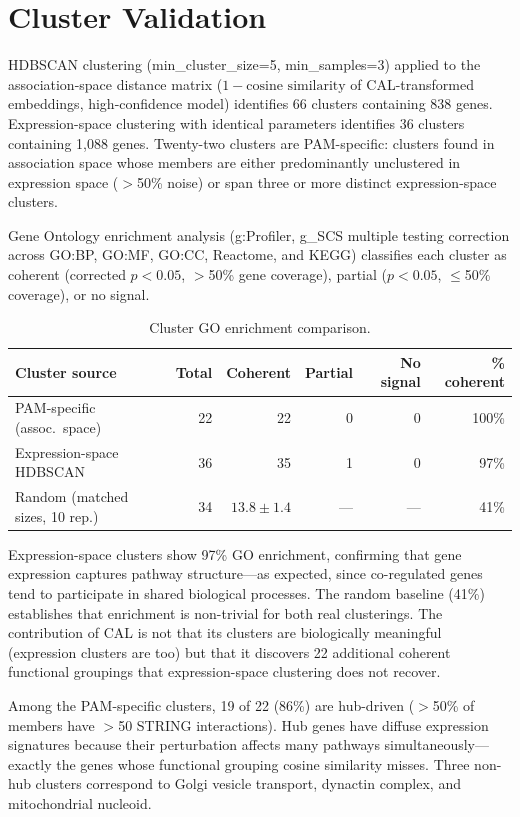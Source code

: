 \documentclass[11pt]{article}
\begin{document}
\section{Cluster Validation}
\label{sec:clusters}

HDBSCAN clustering (min\_cluster\_size=5, min\_samples=3) applied to the association-space distance matrix ($1 - \text{cosine similarity}$ of CAL-transformed embeddings, high-confidence model) identifies 66 clusters containing 838 genes. Expression-space clustering with identical parameters identifies 36 clusters containing 1,088 genes. Twenty-two clusters are PAM-specific: clusters found in association space whose members are either predominantly unclustered in expression space ($>$50\% noise) or span three or more distinct expression-space clusters.

Gene Ontology enrichment analysis (g:Profiler, g\_SCS multiple testing correction across GO:BP, GO:MF, GO:CC, Reactome, and KEGG) classifies each cluster as coherent (corrected $p < 0.05$, $>$50\% gene coverage), partial ($p < 0.05$, $\leq$50\% coverage), or no signal.

\begin{table}[h]
\centering
\caption{Cluster GO enrichment comparison.}
\label{tab:clusters}
\begin{tabular}{lrrrrr}
\toprule
Cluster source & Total & Coherent & Partial & No signal & \% coherent \\
\midrule
PAM-specific (assoc.\ space) & 22 & 22 & 0 & 0 & 100\% \\
Expression-space HDBSCAN & 36 & 35 & 1 & 0 & 97\% \\
Random (matched sizes, 10 rep.) & 34 & $13.8 \pm 1.4$ & --- & --- & 41\% \\
\bottomrule
\end{tabular}
\end{table}

Expression-space clusters show 97\% GO enrichment, confirming that gene expression captures pathway structure---as expected, since co-regulated genes tend to participate in shared biological processes. The random baseline (41\%) establishes that enrichment is non-trivial for both real clusterings. The contribution of CAL is not that its clusters are biologically meaningful (expression clusters are too) but that it discovers 22 additional coherent functional groupings that expression-space clustering does not recover.

Among the PAM-specific clusters, 19 of 22 (86\%) are hub-driven ($>$50\% of members have $>$50 STRING interactions). Hub genes have diffuse expression signatures because their perturbation affects many pathways simultaneously---exactly the genes whose functional grouping cosine similarity misses. Three non-hub clusters correspond to Golgi vesicle transport, dynactin complex, and mitochondrial nucleoid.
\end{document}
